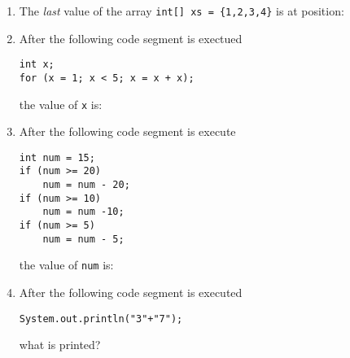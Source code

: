 \begin{enumerate}
\item The \emph{last} value of the array \texttt{int[] xs = \{1,2,3,4\}} is at position: \Ans

\item After the following code segment is exectued
\begin{verbatim}
int x;
for (x = 1; x < 5; x = x + x);
\end{verbatim}
the value of \texttt{x} is: \Ans

\item After the following code segment is execute
\begin{verbatim}
int num = 15;
if (num >= 20)
    num = num - 20;
if (num >= 10)
    num = num -10;
if (num >= 5)
    num = num - 5;
\end{verbatim}
the value of \texttt{num} is: \Ans

\item After the following code segment is executed
\begin{verbatim}
System.out.println("3"+"7");
\end{verbatim}
what is printed? \Ans
\end{enumerate}


